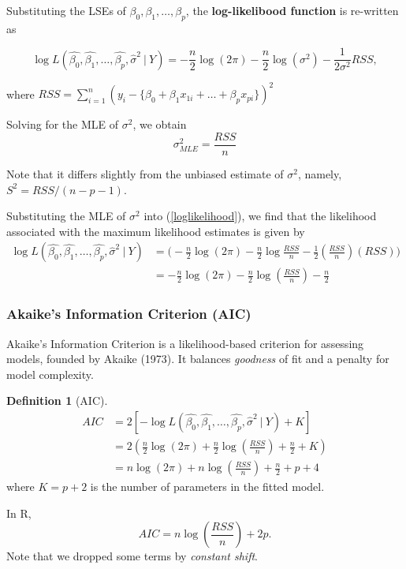 \documentclass[11pt]{article}
\theoremstyle{definition}
\newtheorem{definition}{Definition}[section]
\numberwithin{equation}{section}
\begin{document}
Substituting the LSEs of $\beta_0,\beta_1,\dots,\beta_p$, the \textbf{log-likelibood function} is re-written as

\begin{equation}\label{loglikelihood}
  \log L(\hat{\beta_0},\hat{\beta_1},\dots,\hat{\beta_p},\hat{\sigma}^2\>|\>Y) = -\frac{n}{2}\log(2\pi) - \frac{n}{2}\log(\sigma^2) - \frac{1}{2\sigma^2}RSS,
\end{equation}

where $RSS=\sum^n_{i=1} (y_i - \{\beta_0 + \beta_1x_{1i} + \dots + \beta_px_{pi} \})^2$

Solving for the MLE of $\sigma^2$, we obtain
\begin{equation}
  \sigma^2_{MLE} = \frac{RSS}{n}
\end{equation}

\begin{writenotes}
  Note that it differs slightly from the unbiased estimate of $\sigma^2$, namely, $S^2 = RSS / (n-p-1)$.
\end{writenotes}

Substituting the MLE of $\sigma^2$ into (\ref{loglikelihood}), we find that the likelihood associated with the maximum likelihood estimates is given by
\begin{align}
  \log L(\hat{\beta_0},\hat{\beta_1},\dots,\hat{\beta_p},\hat{\sigma}^2\>|\>Y) 
  &=\Bigg( -\frac{n}{2} \log(2\pi) - \frac{n}{2}\log\frac{RSS}{n} - \frac{1}{2}\left(\frac{RSS}{n}\right)(RSS)\Bigg)
  \\
  &= -\frac{n}{2}\log(2\pi) - \frac{n}{2}\log\left(\frac{RSS}{n}\right) - \frac{n}{2}\
\end{align}

\subsubsection{Akaike's Information Criterion (AIC)}

Akaike's Information Criterion is a likelihood-based criterion for assessing models, founded by Akaike (1973). It balances \textit{goodness} of fit and a penalty for model complexity.

\begin{definition}[AIC]
  \begin{align}
    AIC &= 2\left[ -\log L(\hat{\beta_0},\hat{\beta_1},\dots,\hat{\beta_p},\hat{\sigma}^2 \>|\> Y) + K \right]
    \\
  &=2\left(\frac{n}{2}\log(2\pi) + \frac{n}{2}\log\left( \frac{RSS}{n} \right) + \frac{n}{2} + K\right)\\
  &= n\log(2\pi) + n\log\left(\frac{RSS}{n}\right) + \frac{n}{2} + p + 4
  \end{align}
  where $K = p + 2$ is the number of parameters in the fitted model.
\end{definition}
\begin{writenotes}
  In R,
  \begin{equation}
    AIC = n\log\left(\frac{RSS}{n}\right) + 2p.
  \end{equation}
  Note that we dropped some terms by \textit{constant shift}.
\end{writenotes}
\end{document}
